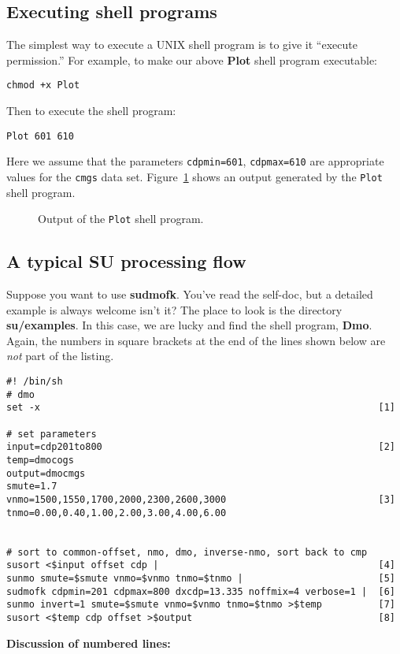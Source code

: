{{{{{{{\begin{enumerate}
\end{enumerate}

\subsection{Executing shell programs}
The simplest way to execute a UNIX shell program is to give
it ``execute permission.''  For example, to make our above {\bf Plot} shell
program executable:
{\small\begin{verbatim}
chmod +x Plot
\end{verbatim}}\noindent
Then to execute the shell program:
{\small\begin{verbatim}
Plot 601 610
\end{verbatim}}\noindent
Here we assume that the parameters \verb:cdpmin=601:, \verb:cdpmax=610: are
appropriate values for the \verb:cmgs: data set.
Figure~\ref{fig:Plot} shows an output generated by the \verb:Plot: shell
program.
\begin{figure}[htbp]
\epsfysize 280pt
\centerline{}
\caption{Output of the \protect\verb:Plot: shell program.}
\label{fig:Plot}
\end{figure}


\subsection{A typical SU processing flow\label{SU:sec:Dmoshell}}
Suppose you want to use {\bf sudmofk}.  You've read the self-doc, but
a detailed example is always welcome isn't it?  The place to look is
the directory {\bf su/examples}.  In this case, we are lucky and find
the shell program, {\bf Dmo}.  Again, the numbers in square brackets at the
end of the lines shown below are {\em not} part of the listing.
{\small\begin{verbatim}
#! /bin/sh
# dmo
set -x                                                            [1]

# set parameters
input=cdp201to800                                                 [2]
temp=dmocogs
output=dmocmgs
smute=1.7
vnmo=1500,1550,1700,2000,2300,2600,3000                           [3]
tnmo=0.00,0.40,1.00,2.00,3.00,4.00,6.00


# sort to common-offset, nmo, dmo, inverse-nmo, sort back to cmp
susort <$input offset cdp |                                       [4]
sunmo smute=$smute vnmo=$vnmo tnmo=$tnmo |                        [5]
sudmofk cdpmin=201 cdpmax=800 dxcdp=13.335 noffmix=4 verbose=1 |  [6]
sunmo invert=1 smute=$smute vnmo=$vnmo tnmo=$tnmo >$temp          [7]
susort <$temp cdp offset >$output                                 [8]
\end{verbatim}}\noindent
{\bf Discussion of numbered lines:}

}}}}}}}
